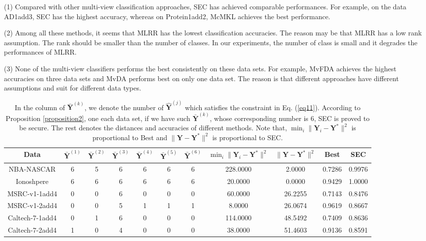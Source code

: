 \documentclass[10pt,journal,compsoc]{IEEEtran}
\begin{document}
(1) Compared with other multi-view classification approaches, SEC has achieved comparable performances. For example, on the data AD1add3, SEC has the highest accuracy, whereas on Protein1add2, McMKL achieves the best performance.

(2) Among all these methods, it seems that MLRR has the lowest classification accuracies. The reason may be that MLRR has a low rank assumption. The rank should be smaller than the number of classes. In our experiments, the number of class is small and it degrades the performances of MLRR.

(3) None of the multi-view classifiers performs the best consistently on these data sets. For example, MvFDA achieves the highest accuracies on three data sets and MvDA performs best on only one data set. The reason is that different approaches have different assumptions and suit for different data types.

\begin{table*}[!t]
\caption{In the column of $\bar{\mathbf{Y}}^{(k)}$, we denote the number of $\hat{\mathbf{Y}}^{(j)}$ which satisfies the constraint in Eq. (\ref{eq11}). According to Proposition \ref{proposition2}, one each data set, if we have such $\bar{\mathbf{Y}}^{(k)}$, whose corresponding number is 6, SEC is proved to be secure. The rest denotes the distances and accuracies of different methods. Note that, $\min_i \|\mathbf{Y}_i-\mathbf{Y}^{*}\|^2$ is proportional to Best and $\|\mathbf{Y} - \mathbf{Y}^{*} \|^2$ is proportional to SEC.}
\label{table_theorem_verify}
\centering
{
\begin{tabular}{c|| c c c c c c | c c | c c }
\hline
  Data          &  \scriptsize{$\bar{\mathbf{Y}}^{(1)}$}  & \scriptsize{$\bar{\mathbf{Y}}^{(2)}$} & \scriptsize{$\bar{\mathbf{Y}}^{(3)}$} & \scriptsize{$\bar{\mathbf{Y}}^{(4)}$} & \scriptsize{$\bar{\mathbf{Y}}^{(5)}$} & \scriptsize{$\bar{\mathbf{Y}}^{(6)}$} & \scriptsize{$\min_i \|\mathbf{Y}_i-\mathbf{Y}^{*}\|^2$} & \scriptsize{$\| \mathbf{Y} - \mathbf{Y}^{*} \|^2$} & Best & SEC \\
\hline
NBA-NASCAR      &    6    &   5  &  6  &  6  &  6  &  6  & 228.0000 & 2.0000   &  0.7286 & 0.9976  \\
Ionoshpere      &    6    &   6  &  6  &  6  &  6  &  6  & 20.0000  & 0.0000   &  0.9429 & 1.0000  \\
MSRC-v1-1add4   &    0    &   0  &  6  &  0  &  0  &  0  & 60.0000  & 26.2255  &  0.7143 & 0.8476  \\
MSRC-v1-2add4   &    0    &   0  &  5  &  1  &  1  &  1  & 8.0000   & 26.0674  &  0.9619 & 0.8667   \\
Caltech-7-1add4 &    0    &   1  &  6  &  0  &  0  &  0  & 114.0000 & 48.5492  &  0.7409 & 0.8636  \\
Caltech-7-2add4 &    1    &   0  &  4  &  0  &  0  &  0  & 38.0000  & 51.4603  &  0.9136 & 0.8591 \\
\hline
\end{tabular}}
\vskip -0.1in
\end{table*}
\end{document}
